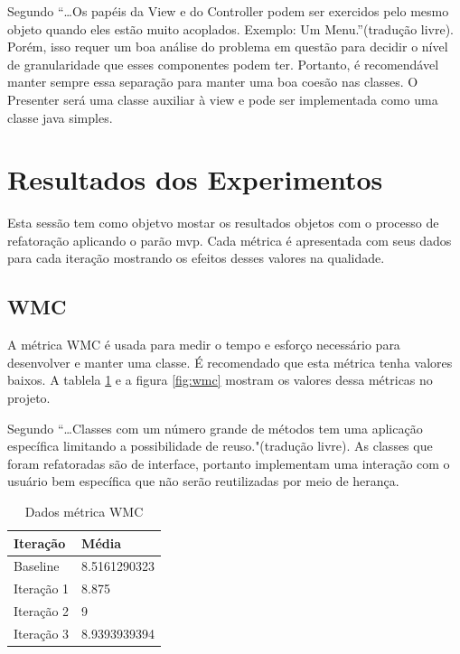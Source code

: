 Segundo  ``\ldots Os papéis da View e do
Controller podem ser exercidos pelo mesmo objeto quando eles estão muito
acoplados. Exemplo: Um Menu.''(tradução livre). Porém, isso requer um boa
análise do problema em questão para decidir o nível de granularidade que esses componentes podem ter.
Portanto, é recomendável manter sempre essa separação para manter uma boa coesão
nas classes. O Presenter será uma classe auxiliar à view e pode ser implementada
como uma classe java simples. 



\section{Resultados dos Experimentos}

Esta sessão tem como objetvo mostar os resultados objetos com o processo de
refatoração aplicando o parão mvp. Cada métrica é apresentada com seus dados
para cada iteração mostrando os efeitos desses valores na qualidade.

\subsection{WMC}


A métrica WMC é usada para medir o tempo e esforço necessário para desenvolver e
manter uma classe. É recomendado que esta métrica tenha valores baixos. A
tablela \ref{tab:wmc} e a figura \ref{fig:wmc} mostram os valores dessa métricas
no projeto.

Segundo  “\ldots Classes com um número grande de métodos
tem uma aplicação específica limitando a possibilidade de reuso."(tradução
livre). As classes que foram refatoradas são de interface, portanto
implementam uma interação com o usuário bem específica que não serão
reutilizadas por meio de herança.
\begin{table}[h]
	\centering
    \begin{tabular}{ | l | l | }
    \hline
    Iteração & Média 			\\ \hline
    Baseline & 8.5161290323   	\\ \hline
    Iteração 1 & 8.875			\\ \hline
	Iteração 2 & 9				\\ \hline
	Iteração 3 & 8.9393939394	\\ \hline
    \end{tabular}
    \caption{Dados métrica WMC}
    \label{tab:wmc}
\end{table}

